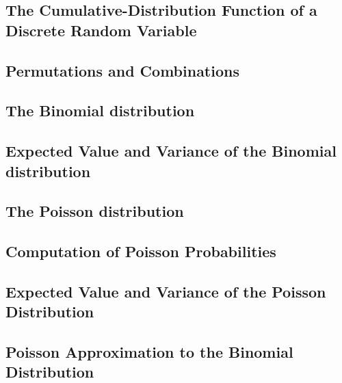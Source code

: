 \documentclass[12pt,]{article}
\begin{document}
\hypertarget{the-cumulative-distribution-function-of-a-discrete-random-variable}{%
\subsection{The Cumulative-Distribution Function of a Discrete Random
Variable}\label{the-cumulative-distribution-function-of-a-discrete-random-variable}}

\hypertarget{permutations-and-combinations}{%
\subsection{Permutations and
Combinations}\label{permutations-and-combinations}}

\hypertarget{the-binomial-distribution}{%
\subsection{The Binomial distribution}\label{the-binomial-distribution}}

\hypertarget{expected-value-and-variance-of-the-binomial-distribution}{%
\subsection{Expected Value and Variance of the Binomial
distribution}\label{expected-value-and-variance-of-the-binomial-distribution}}

\hypertarget{the-poisson-distribution}{%
\subsection{The Poisson distribution}\label{the-poisson-distribution}}

\hypertarget{computation-of-poisson-probabilities}{%
\subsection{Computation of Poisson
Probabilities}\label{computation-of-poisson-probabilities}}

\hypertarget{expected-value-and-variance-of-the-poisson-distribution}{%
\subsection{Expected Value and Variance of the Poisson
Distribution}\label{expected-value-and-variance-of-the-poisson-distribution}}

\hypertarget{poisson-approximation-to-the-binomial-distribution}{%
\subsection{Poisson Approximation to the Binomial
Distribution}\label{poisson-approximation-to-the-binomial-distribution}}
\end{document}
